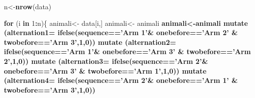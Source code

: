 \documentclass[]{article}
\newenvironment{Shaded}{\begin{snugshade}}{\end{snugshade}}
\newcommand{\ControlFlowTok}[1]{\textcolor[rgb]{0.13,0.29,0.53}{\textbf{#1}}}
\newcommand{\DataTypeTok}[1]{\textcolor[rgb]{0.13,0.29,0.53}{#1}}
\newcommand{\DecValTok}[1]{\textcolor[rgb]{0.00,0.00,0.81}{#1}}
\newcommand{\KeywordTok}[1]{\textcolor[rgb]{0.13,0.29,0.53}{\textbf{#1}}}
\newcommand{\NormalTok}[1]{#1}
\newcommand{\OperatorTok}[1]{\textcolor[rgb]{0.81,0.36,0.00}{\textbf{#1}}}
\newcommand{\StringTok}[1]{\textcolor[rgb]{0.31,0.60,0.02}{#1}}
\begin{document}
\begin{Shaded}
\begin{Highlighting}[]
\NormalTok{n<-}\KeywordTok{nrow}\NormalTok{(data)}

\ControlFlowTok{for}\NormalTok{ (i }\ControlFlowTok{in} \DecValTok{1}\OperatorTok{:}\NormalTok{n)\{}
\NormalTok{  animali<-}\StringTok{ }\NormalTok{data[i,]}
\NormalTok{  animali<-}\StringTok{ }\NormalTok{animali }\OperatorTok{%>%}\StringTok{ }\KeywordTok{select}\NormalTok{ (}\StringTok{'Visited zones'}\NormalTok{, }\KeywordTok{contains}\NormalTok{(}\StringTok{"X"}\NormalTok{))  }\OperatorTok{%>%}\StringTok{ }\KeywordTok{gather}\NormalTok{(variable, sequence) }\OperatorTok{%>%}\StringTok{ }\KeywordTok{select}\NormalTok{(sequence) }\OperatorTok{%>%}\StringTok{ }\KeywordTok{filter}\NormalTok{(sequence }\OperatorTok{!=}\NormalTok{(}\StringTok{'Center'}\NormalTok{))}
\NormalTok{  animali<-animali }\OperatorTok{%>%}\StringTok{ }\KeywordTok{mutate}\NormalTok{ (}\DataTypeTok{onebefore=} \KeywordTok{lag}\NormalTok{(sequence)) }\OperatorTok{%>%}\StringTok{ }\KeywordTok{mutate}\NormalTok{ (}\DataTypeTok{twobefore=}\KeywordTok{lag}\NormalTok{(onebefore)) }\OperatorTok{%>%}\StringTok{ }\KeywordTok{mutate}\NormalTok{(}\DataTypeTok{threebefore=}\KeywordTok{lag}\NormalTok{(twobefore)) }\OperatorTok{%>%}\StringTok{ }
\StringTok{    }\KeywordTok{mutate}\NormalTok{ (}\DataTypeTok{alternation1=} \KeywordTok{ifelse}\NormalTok{(sequence}\OperatorTok{==}\StringTok{'Arm 1'}\OperatorTok{&}\StringTok{ }\NormalTok{onebefore}\OperatorTok{==}\StringTok{'Arm 2'} \OperatorTok{&}\StringTok{ }\NormalTok{twobefore}\OperatorTok{==}\StringTok{'Arm 3'}\NormalTok{,}\DecValTok{1}\NormalTok{,}\DecValTok{0}\NormalTok{)) }\OperatorTok{%>%}\StringTok{ }
\StringTok{    }\KeywordTok{mutate}\NormalTok{ (}\DataTypeTok{alternation2=} \KeywordTok{ifelse}\NormalTok{(sequence}\OperatorTok{==}\StringTok{'Arm 1'}\OperatorTok{&}\StringTok{ }\NormalTok{onebefore}\OperatorTok{==}\StringTok{'Arm 3'} \OperatorTok{&}\StringTok{ }\NormalTok{twobefore}\OperatorTok{==}\StringTok{'Arm 2'}\NormalTok{,}\DecValTok{1}\NormalTok{,}\DecValTok{0}\NormalTok{)) }\OperatorTok{%>%}\StringTok{ }
\StringTok{    }\KeywordTok{mutate}\NormalTok{ (}\DataTypeTok{alternation3=} \KeywordTok{ifelse}\NormalTok{(sequence}\OperatorTok{==}\StringTok{'Arm 2'}\OperatorTok{&}\StringTok{ }\NormalTok{onebefore}\OperatorTok{==}\StringTok{'Arm 3'} \OperatorTok{&}\StringTok{ }\NormalTok{twobefore}\OperatorTok{==}\StringTok{'Arm 1'}\NormalTok{,}\DecValTok{1}\NormalTok{,}\DecValTok{0}\NormalTok{)) }\OperatorTok{%>%}\StringTok{ }
\StringTok{    }\KeywordTok{mutate}\NormalTok{ (}\DataTypeTok{alternation4=} \KeywordTok{ifelse}\NormalTok{(sequence}\OperatorTok{==}\StringTok{'Arm 2'}\OperatorTok{&}\StringTok{ }\NormalTok{onebefore}\OperatorTok{==}\StringTok{'Arm 1'} \OperatorTok{&}\StringTok{ }\NormalTok{twobefore}\OperatorTok{==}\StringTok{'Arm 3'}\NormalTok{,}\DecValTok{1}\NormalTok{,}\DecValTok{0}\NormalTok{)) }\OperatorTok{%>%}\StringTok{ }
}}}}}}
\end{Highlighting}
\end{Shaded}
\end{document}

